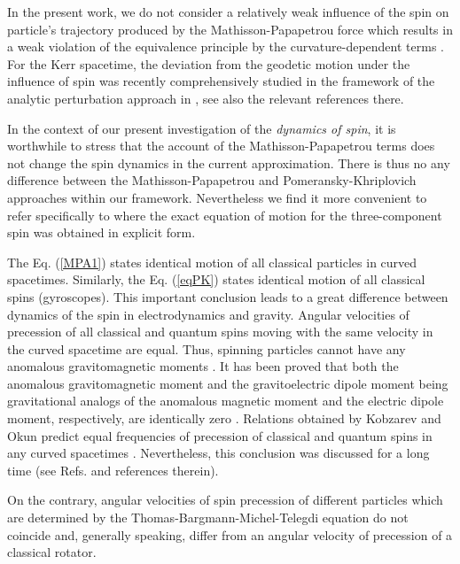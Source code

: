 \documentclass[preprint,showpacs,preprintnumbers,amsmath,amssymb]{revtex4}
\begin{document}
In the present work, we do not consider a relatively weak influence
of the spin on particle's trajectory produced by the
Mathisson-Papapetrou force \cite{PK,Mathisson,Papapetrou} which
results in a weak violation of the equivalence principle by
the curvature-dependent terms \cite{Plyatsko}. For the Kerr
spacetime, the deviation from the geodetic motion under the
influence of spin was recently comprehensively studied in the
framework of the analytic perturbation approach in \cite{singh},
see also the relevant references there.

In the context of our present investigation of the {\it dynamics of spin},
it is worthwhile to stress that the account of the Mathisson-Papapetrou
terms does not change the spin dynamics in the current approximation.
There is thus no any difference between the Mathisson-Papapetrou and
Pomeransky-Khriplovich approaches within our framework. Nevertheless
we find it more convenient to refer specifically to \cite{PK} where
the exact equation of motion for the three-component spin was
obtained in explicit form.

The Eq. (\ref{MPA1}) states identical motion of all classical
particles in curved spacetimes. Similarly, the Eq. (\ref{eqPK})
states identical motion of all classical spins (gyroscopes). This
important conclusion leads to a great difference between dynamics
of the spin in electrodynamics and gravity. Angular velocities of
precession of all classical and quantum spins moving with the same
velocity in the curved spacetime are equal. Thus, spinning
particles cannot have any anomalous gravitomagnetic moments
\cite{KO}. It has been proved that both the anomalous
gravitomagnetic moment and the gravitoelectric dipole moment being
gravitational analogs of the anomalous magnetic moment and the
electric dipole moment, respectively, are identically zero
\cite{KO}. Relations obtained by Kobzarev and Okun predict equal
frequencies of precession of classical and quantum spins in any
curved spacetimes \cite{T1,PRD2}. Nevertheless, this conclusion
was discussed for a long time (see Refs.
\cite{Mashhoon2,PRD,PRD2,Warszawa} and references therein).

On the contrary, angular velocities of spin precession of different
particles which are determined by the Thomas-Bargmann-Michel-Telegdi
equation \cite{Thoms,BMT} do not coincide and, generally speaking,
differ from an angular velocity of precession of a classical rotator.
\end{document}
